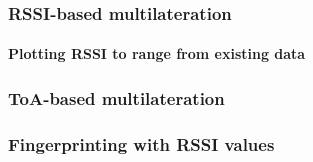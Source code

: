 \subsubsection{\ac{RSSI}-based multilateration}

\paragraph{Plotting \ac{RSSI} to range from existing data}


\subsubsection{\ac{ToA}-based multilateration}


\subsubsection{Fingerprinting with \ac{RSSI} values}

